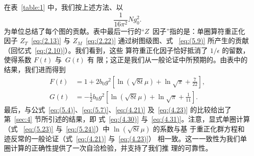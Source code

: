 在表~\ref{table:1} 中，我们按上述方法、以
\begin{equation}
   \frac{1}{16\pi^2}Ng_0^2.
\label{eq:(5.22)}
\end{equation}
为单位总结了每个图的贡献。表中最后一行的“$Z$~因子”指的是：单圈算符重正化
因子 $Z_T$~\eqref{eq:(2.13)} 与 $Z_M$~\eqref{eq:(2.22)} 通过树图级图、式%
~\eqref{eq:(5.9)} 所产生的贡献（回忆式~\eqref{eq:(2.10)}）。我们看到，这些
算符重正化因子恰好抵消了 $1/\epsilon$ 的留数，使得系数 $F(t)$ 与~$G(t)$ 有
限；这正是我们从一般论证中所预期的。由表中的结果，我们进而得到
\begin{align}
   F(t)&=1+2b_0g^2
   \left[\ln(\sqrt{8t}\mu)+\ln\sqrt{\pi}+\frac{7}{22}\right],
\label{eq:(5.23)}
\\
   G(t)&=-\frac{1}{2}b_0g^2
   \left[\ln(\sqrt{8t}\mu)+\ln\sqrt{\pi}+\frac{1}{11}\right].
\label{eq:(5.24)}
\end{align}
最后，与公式~\eqref{eq:(5.4)}、\eqref{eq:(5.7)}、\eqref{eq:(4.21)}
及~\eqref{eq:(4.23)} 的比较给出了第~\ref{sec:4} 节所引述的结果，即
式~\eqref{eq:(4.30)} 与~\eqref{eq:(4.31)}。注意，显式单圈计算（式%
~\eqref{eq:(5.23)} 与~\eqref{eq:(5.24)}）中 $\ln(\sqrt{8t}\mu)$ 的系数与基
于重正化群方程和迹反常的一般论证（式~\eqref{eq:(4.21)} 与~\eqref{eq:(4.23)}）
相一致。这一一致性为我们单圈计算的正确性提供了一次自洽检验，并支持了我们推
理的可靠性。
